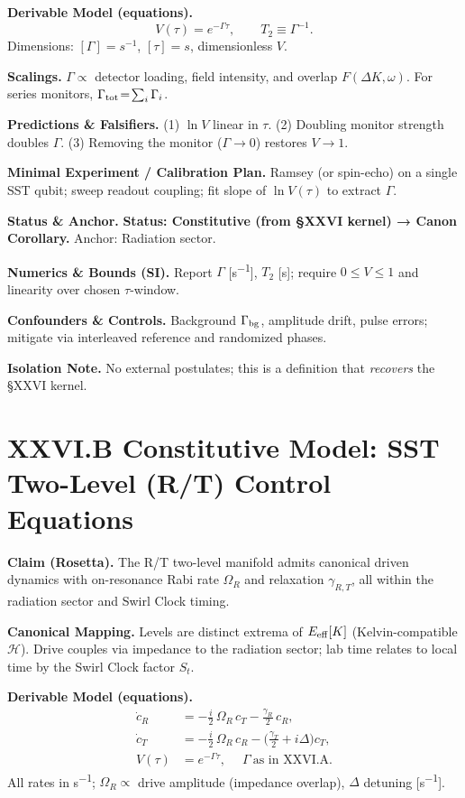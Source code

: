 \documentclass[10pt,reprint,aps,onecolumn,nofootinbib]{revtex4-2}
\begin{document}
    \textbf{Derivable Model (equations).}
    \[
        V(\tau) = e^{-\Gamma \tau} ,\qquad T_2 \equiv \Gamma^{-1} .
    \]
    Dimensions: $[\Gamma]=\si{s^{-1}}$, $[\tau]=\si{s}$, dimensionless $V$.

    \textbf{Scalings.}
    \;$\Gamma \propto$ detector loading, field intensity, and overlap $F(\Delta K,\omega)$. For series monitors, $\Gamma_{\rm tot}\!=\!\sum_i \Gamma_i$.

    \textbf{Predictions \& Falsifiers.}
    (1) $\ln V$ linear in $\tau$. (2) Doubling monitor strength doubles $\Gamma$. (3) Removing the monitor ($\Gamma\!\to\!0$) restores $V\!\to\!1$.

    \textbf{Minimal Experiment / Calibration Plan.}
    Ramsey (or spin-echo) on a single SST qubit; sweep readout coupling; fit slope of $\ln V(\tau)$ to extract $\Gamma$.

    \textbf{Status \& Anchor.}
    \textbf{Status: Constitutive (from §XXVI kernel) → Canon Corollary.} Anchor: Radiation sector.

    \textbf{Numerics \& Bounds (SI).}
    Report $\Gamma$ [\si{s^{-1}}], $T_2$ [\si{s}]; require $0\!\le\!V\!\le\!1$ and linearity over chosen $\tau$-window.

    \textbf{Confounders \& Controls.}
    Background $\Gamma_{\rm bg}$, amplitude drift, pulse errors; mitigate via interleaved reference and randomized phases.

    \textbf{Isolation Note.}
    No external postulates; this is a definition that \emph{recovers} the §XXVI kernel.


    \section*{XXVI.B Constitutive Model: SST Two-Level (R/T) Control Equations}

    \textbf{Claim (Rosetta).}
    The R/T two-level manifold admits canonical driven dynamics with on-resonance Rabi rate $\Omega_R$ and relaxation $\gamma_{R,T}$, all within the radiation sector and Swirl Clock timing.

    \textbf{Canonical Mapping.}
    Levels are distinct extrema of $E_{\rm eff}[K]$ (Kelvin-compatible $\mathcal H$). Drive couples via impedance to the radiation sector; lab time relates to local time by the Swirl Clock factor $S_t$.

    \textbf{Derivable Model (equations).}
    \[
        \begin{aligned}
            \dot c_R &= -\tfrac{i}{2}\,\Omega_R\, c_T - \tfrac{\gamma_R}{2}\,c_R,\\
            \dot c_T &= -\tfrac{i}{2}\,\Omega_R\, c_R - \Big(\tfrac{\gamma_T}{2}+ i\Delta\Big) c_T,\\
            V(\tau) &= e^{-\Gamma \tau},\quad \; \Gamma\ \text{as in XXVI.A}.
        \end{aligned}
    \]
    All rates in \si{s^{-1}}; $\Omega_R\!\propto$ drive amplitude (impedance overlap), $\Delta$ detuning [\si{s^{-1}}].
\end{document}
